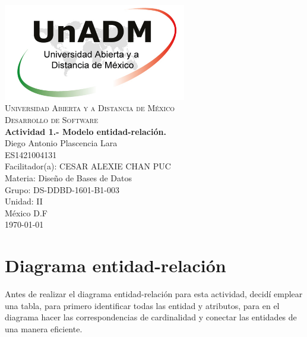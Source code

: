 \documentclass[spanish,12pt,letterpapper]{article}
\begin{document}
	\begin{titlepage}
		\begin{center}
			\includegraphics[width=0.6\textwidth]{../logoUnADM}~\\[1cm] 
			\textsc{Universidad Abierta y a Distancia de México}\\[0.8cm]
			\textsc{Desarrollo de Software}\\[1.8cm]
			
			\textbf{ \Large Actividad 1.- Modelo entidad-relación.}\\[3cm]
			
			Diego Antonio Plascencia Lara\\ ES1421004131 \\[0.4cm]
			Facilitador(a): CESAR ALEXIE CHAN PUC  \\
			Materia: Diseño de Bases de Datos\\
			Grupo: DS-DDBD-1601-B1-003 \\
			Unidad: II \\
			
			\vfill México D.F\\{\today}
			
		\end{center}
	\end{titlepage}
	\section{Diagrama entidad-relación}
	Antes de realizar el diagrama entidad-relación para esta actividad, decidí emplear una tabla, para primero identificar todas las entidad y atributos, para en el diagrama hacer las correspondencias de cardinalidad y conectar las entidades de una manera eficiente.
	
\end{document}
